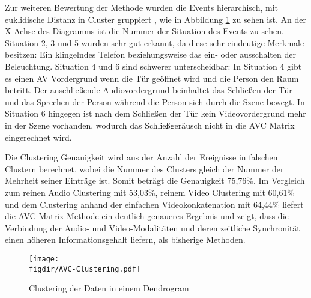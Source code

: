 Zur weiteren Bewertung der Methode wurden die Events hierarchisch, mit euklidische Distanz in Cluster gruppiert \cite{JD:ACD} , wie in Abbildung \ref{FIG:AVC:Clustering} zu sehen ist. An der X-Achse des Diagramms ist die Nummer der Situation des Events zu sehen. Situation 2, 3 und 5 wurden sehr gut erkannt, da diese sehr eindeutige Merkmale besitzen: Ein klingelndes Telefon beziehungsweise das ein- oder ausschalten der Beleuchtung. Situation 4 und 6 sind schwerer unterscheidbar: In Situation 4 gibt es einen AV Vordergrund wenn die Tür geöffnet wird und die Person den Raum betritt. Der anschließende Audiovordergrund beinhaltet das Schließen der Tür und das Sprechen der Person während die Person sich durch die Szene bewegt. In Situation 6 hingegen ist nach dem Schließen der Tür kein Videovordergrund mehr in der Szene vorhanden, wodurch das Schließgeräusch nicht in die AVC Matrix eingerechnet wird.

Die Clustering Genauigkeit wird aus der Anzahl der Ereignisse in falschen Clustern berechnet, wobei die Nummer des Clusters gleich der Nummer der Mehrheit seiner Einträge ist. Somit beträgt die Genauigkeit 75,76\%. Im Vergleich zum reinen Audio Clustering mit 53,03\%, reinem Video Clustering mit 60,61\% und dem Clustering anhand der einfachen Videokonkatenation mit 64,44\% liefert die AVC Matrix Methode ein deutlich genaueres Ergebnis und zeigt, dass die Verbindung der Audio- und Video-Modalitäten und deren zeitliche Synchronität einen höheren Informationsgehalt liefern, als bisherige Methoden.

\begin{figure} 
\centering
\texttt{[image: \\figdir/AVC-Clustering.pdf]}
\caption{Clustering der Daten in einem Dendrogram}
\label{FIG:AVC:Clustering}
\end{figure}
